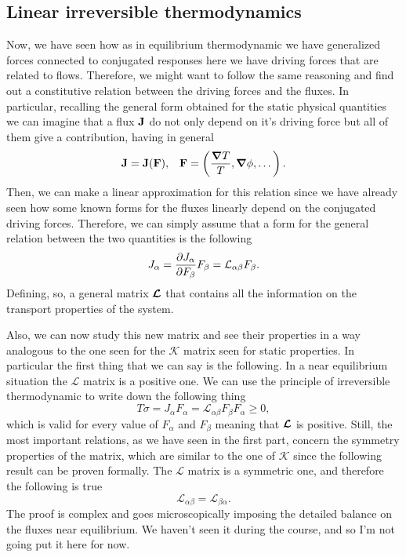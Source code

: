 \subsection{Linear irreversible thermodynamics}

Now, we have seen how as in equilibrium thermodynamic we have generalized forces connected to conjugated responses here we have driving forces that are related to flows. Therefore, we might want to follow the same reasoning and find out a constitutive relation between the driving forces and the fluxes. In particular, recalling the general form obtained for the static physical quantities we can imagine that a flux $\vb{J}$ do not only depend on it's driving force but all of them give a contribution, having in general
\begin{align}
    &\vb{J} = \vb{J}(\vb{F}), &\vb{F} = \left(\frac{\grad T}{T}, \grad \phi, \dots\right).
\end{align}
Then, we can make a linear approximation for this relation since we have already seen how some known forms for the fluxes linearly depend on the conjugated driving forces. Therefore, we can simply assume that a form for the general relation between the two quantities is the following
\begin{equation}
    J_\alpha = \pdv{J_\alpha}{F_\beta}F_\beta = \mathcal{L}_{\alpha\beta}F_\beta.
\end{equation}
Defining, so, a general matrix $\vb*{\mathcal{L}}$ that contains all the information on the transport properties of the system.

Also, we can now study this new matrix and see their properties in a way analogous to the one seen for the $\mathcal{K}$ matrix seen for static properties. In particular the first thing that we can say is the following.
{
    In a near equilibrium situation the $\mathcal{L}$ matrix is a positive one.
}
{
    We can use the principle of irreversible thermodynamic to write down the following thing
    \begin{equation}
        T\dot{\sigma} = J_\alpha F_\alpha = \mathcal{L}_{\alpha\beta}F_\beta F_\alpha \ge 0,
    \end{equation}
    which is valid for every value of $F_\alpha$ and $F_\beta$ meaning that $\vb*{\mathcal{L}}$ is positive.
}
\noindent
Still, the most important relations, as we have seen in the first part, concern the symmetry properties of the matrix, which are similar to the one of $\mathcal{K}$ since the following result can be proven formally.
{
    The $\mathcal{L}$ matrix is a symmetric one, and therefore the following is true
    \begin{equation}
        \mathcal{L}_{\alpha\beta} = \mathcal{L}_{\beta\alpha}.
    \end{equation}
}
{
    The proof is complex and goes microscopically imposing the detailed balance on the fluxes near equilibrium. We haven't seen it during the course, and so I'm not going put it here for now.
}


